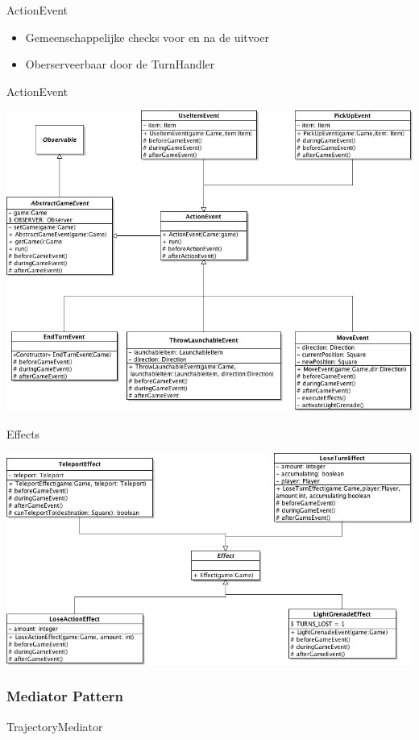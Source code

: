 \documentclass[t]{beamer}
\begin{document}
\begin{frame}{ActionEvent}
\begin{itemize}
	\item Gemeenschappelijke checks voor en na de uitvoer
	\item Oberserveerbaar door de TurnHandler
\end{itemize}
\end{frame}

\begin{frame}{ActionEvent}
\begin{center}
\includegraphics[width=0.65\linewidth]{images/ActionEvents}
\end{center}
\end{frame}

\begin{frame}{Effects}
\begin{center}
\includegraphics[width=0.75\linewidth]{images/Effects}
\end{center}
\end{frame}

\subsubsection{Mediator Pattern}
\begin{frame}{TrajectoryMediator}
\begin{center}
\end{center}
\end{frame}
\end{document}
